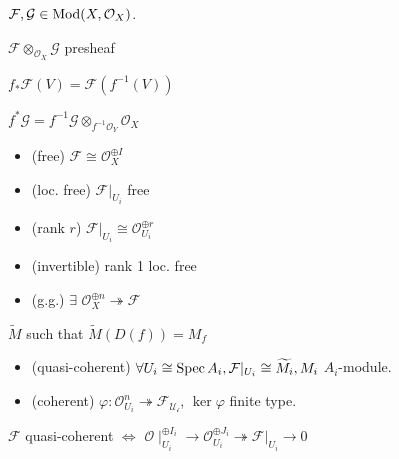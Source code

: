 $\mathcal{F}, \mathcal{G} \in \operatorname{Mod}(X, \mathcal{O}_X )$.

\begin{proposition}
$\mathcal{F} \otimes _{\mathcal{O} _X} \mathcal{G} $ presheaf
\end{proposition}

\begin{definition}[Pushforward] $f_* \mathcal{F} (V) = \mathcal{F} (f^{-1}(V))$
\end{definition}

\begin{definition}[Pullback] $f^* \mathcal{G} = f^{-1} \mathcal{G} \otimes _{f^{-1} \mathcal{O}_Y} \mathcal{O}_X $
\end{definition}

\begin{definition}
\begin{itemize}[topsep=-6pt, itemsep=0pt]
    \item (free) $\mathcal{F} \cong \mathcal{O}_X^{\oplus I}$
    \item (loc. free) $\mathcal{F}|_{U_i}$ free
    \item (rank $r$) $\mathcal{F}|_{U_i} \cong \mathcal{O}_{U_i}^{\oplus r}$
    \item (invertible) rank 1 loc. free
    \item (g.g.) $\exists$ $\mathcal{O}_X^{\oplus n} \twoheadrightarrow  \mathcal{F}$
\end{itemize}
\end{definition}

\begin{definition}$\tilde{M}$ such that $\tilde{M}(D(f)) = M_f$
\end{definition}

\begin{definition}
\begin{itemize}[topsep=-6pt, itemsep=0pt]
    \item (quasi-coherent) $\forall U_i \cong \operatorname{Spec} A_i, \mathcal{F}|_{U_i} \cong \widetilde{M_i}, M_i$ $A_i$-module.
    \item (coherent) $\varphi : \mathcal{O}_{U_i}^n \twoheadrightarrow \mathcal{F_{U_i}}$, $\ker \varphi $ finite type.
\end{itemize}
\end{definition}

\begin{proposition} $\mathcal{F} $ quasi-coherent $ \Leftrightarrow $ $ \mathcal{O}\mid _{U_i} ^{ \oplus I_i} \to \mathcal{O}_{U_i} ^{ \oplus J_i} \twoheadrightarrow  \mathcal{F}|_{U_i} \to 0 $
\end{proposition}

